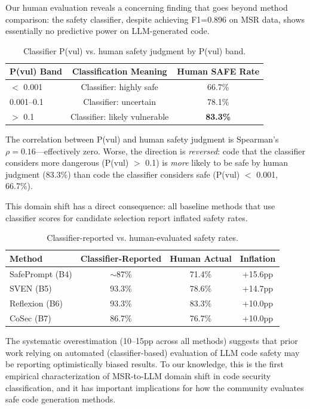 \documentclass[sigconf,10pt]{acmart}
\begin{document}
Our human evaluation reveals a concerning finding that goes beyond method comparison: the safety classifier, despite achieving F1=0.896 on MSR data, shows essentially no predictive power on LLM-generated code.

\begin{table}[h]
\centering
\caption{Classifier P(vul) vs. human safety judgment by P(vul) band.}
\label{tab:domain_shift}
\begin{tabular}{lcc}
\toprule
P(vul) Band & Classification Meaning & Human SAFE Rate \\
\midrule
$<$ 0.001 & Classifier: highly safe & 66.7\% \\
0.001--0.1 & Classifier: uncertain & 78.1\% \\
$>$ 0.1 & Classifier: likely vulnerable & \textbf{83.3\%} \\
\bottomrule
\end{tabular}
\end{table}

The correlation between P(vul) and human safety judgment is Spearman's $\rho=0.16$---effectively zero. Worse, the direction is \textit{reversed}: code that the classifier considers more dangerous (P(vul) $>$ 0.1) is \textit{more} likely to be safe by human judgment (83.3\%) than code the classifier considers safe (P(vul) $<$ 0.001, 66.7\%).

This domain shift has a direct consequence: all baseline methods that use classifier scores for candidate selection report inflated safety rates.

\begin{table}[h]
\centering
\caption{Classifier-reported vs. human-evaluated safety rates.}
\label{tab:inflation}
\begin{tabular}{lccc}
\toprule
Method & Classifier-Reported & Human Actual & Inflation \\
\midrule
SafePrompt (B4) & $\sim$87\% & 71.4\% & +15.6pp \\
SVEN (B5) & 93.3\% & 78.6\% & +14.7pp \\
Reflexion (B6) & 93.3\% & 83.3\% & +10.0pp \\
CoSec (B7) & 86.7\% & 76.7\% & +10.0pp \\
\bottomrule
\end{tabular}
\end{table}

The systematic overestimation (10--15pp across all methods) suggests that prior work relying on automated (classifier-based) evaluation of LLM code safety may be reporting optimistically biased results. To our knowledge, this is the first empirical characterization of MSR-to-LLM domain shift in code security classification, and it has important implications for how the community evaluates safe code generation methods.
\end{document}
